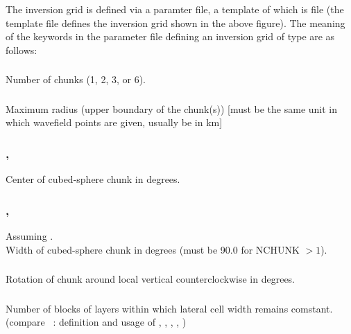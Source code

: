 The inversion grid is defined via a paramter file, a template of which is file 
 (the template file defines the inversion grid
shown in the above figure).
The meaning of the keywords in the parameter file defining an inversion grid of type 
are as follows:

\subsubsection{} %
Number of chunks (1, 2, 3, or 6).
\subsubsection{} 
Maximum radius (upper boundary of the chunk(s)) [must be the same unit in which wavefield points are given, usually be in km]
\subsubsection{, } 
Center of cubed-sphere chunk in degrees.
\subsubsection{, } 
Assuming .\\
Width of cubed-sphere chunk in degrees (must be 90.0 for NCHUNK $> 1$).
\subsubsection{} 
Rotation of chunk around local vertical counterclockwise in degrees.
\subsubsection{}
Number of blocks of layers within which lateral cell width remains comstant.\\
(compare ~: definition and usage of , 
, , , )
